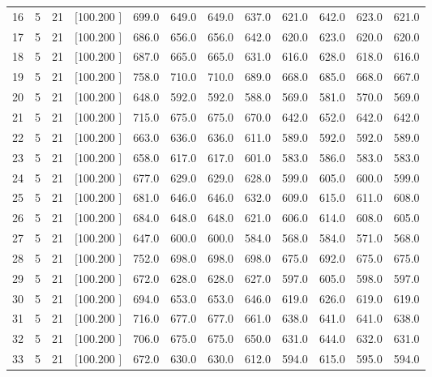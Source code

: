 \documentclass[12pt,a4paper]{article}
\begin{document}
\begin{center}
{\begin{tabular}{r r r r r r r r r r r r}
  16&  5& 21&[100.200   ]&   699.0&   649.0&   649.0&   637.0&   621.0&   642.0&   623.0&   621.0\\[-0.02in]
  17&  5& 21&[100.200   ]&   686.0&   656.0&   656.0&   642.0&   620.0&   623.0&   620.0&   620.0\\[-0.02in]
  18&  5& 21&[100.200   ]&   687.0&   665.0&   665.0&   631.0&   616.0&   628.0&   618.0&   616.0\\[-0.02in]
  19&  5& 21&[100.200   ]&   758.0&   710.0&   710.0&   689.0&   668.0&   685.0&   668.0&   667.0\\[-0.02in]
  20&  5& 21&[100.200   ]&   648.0&   592.0&   592.0&   588.0&   569.0&   581.0&   570.0&   569.0\\[-0.02in]
  21&  5& 21&[100.200   ]&   715.0&   675.0&   675.0&   670.0&   642.0&   652.0&   642.0&   642.0\\[-0.02in]
  22&  5& 21&[100.200   ]&   663.0&   636.0&   636.0&   611.0&   589.0&   592.0&   592.0&   589.0\\[-0.02in]
  23&  5& 21&[100.200   ]&   658.0&   617.0&   617.0&   601.0&   583.0&   586.0&   583.0&   583.0\\[-0.02in]
  24&  5& 21&[100.200   ]&   677.0&   629.0&   629.0&   628.0&   599.0&   605.0&   600.0&   599.0\\[-0.02in]
  25&  5& 21&[100.200   ]&   681.0&   646.0&   646.0&   632.0&   609.0&   615.0&   611.0&   608.0\\[-0.02in]
  26&  5& 21&[100.200   ]&   684.0&   648.0&   648.0&   621.0&   606.0&   614.0&   608.0&   605.0\\[-0.02in]
  27&  5& 21&[100.200   ]&   647.0&   600.0&   600.0&   584.0&   568.0&   584.0&   571.0&   568.0\\[-0.02in]
  28&  5& 21&[100.200   ]&   752.0&   698.0&   698.0&   698.0&   675.0&   692.0&   675.0&   675.0\\[-0.02in]
  29&  5& 21&[100.200   ]&   672.0&   628.0&   628.0&   627.0&   597.0&   605.0&   598.0&   597.0\\[-0.02in]
  30&  5& 21&[100.200   ]&   694.0&   653.0&   653.0&   646.0&   619.0&   626.0&   619.0&   619.0\\[-0.02in]
  31&  5& 21&[100.200   ]&   716.0&   677.0&   677.0&   661.0&   638.0&   641.0&   641.0&   638.0\\[-0.02in]
  32&  5& 21&[100.200   ]&   706.0&   675.0&   675.0&   650.0&   631.0&   644.0&   632.0&   631.0\\[-0.02in]
  33&  5& 21&[100.200   ]&   672.0&   630.0&   630.0&   612.0&   594.0&   615.0&   595.0&   594.0\\[-0.02in]

\end{tabular}}
\end{center}
\end{document}
